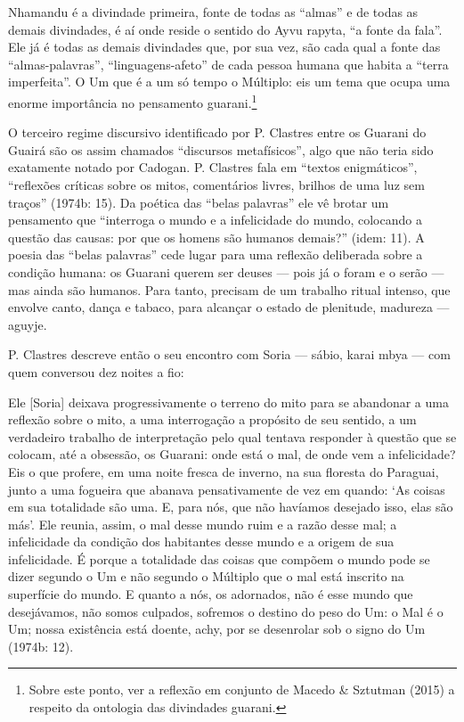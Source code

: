 Nhamandu é a divindade primeira, fonte de todas as ``almas'' e de todas as
demais divindades, é aí onde reside o sentido do Ayvu rapyta, ``a fonte
da fala''. Ele já é todas as demais divindades que, por sua vez, são
cada qual a fonte das ``almas-palavras'', ``linguagens-afeto'' de cada
pessoa humana que habita a ``terra imperfeita''. O Um que é a um só tempo
o Múltiplo: eis um tema que ocupa uma enorme importância no pensamento
guarani.\footnote{Sobre este ponto, ver a reflexão em conjunto de
Macedo \& Sztutman (2015) a respeito da ontologia das divindades
guarani.}

O terceiro regime discursivo identificado por P. Clastres entre os
Guarani do Guairá são os assim chamados ``discursos metafísicos'', algo
que não teria sido exatamente notado por Cadogan. P. Clastres fala em
``textos enigmáticos'', ``reflexões críticas sobre os mitos, comentários
livres, brilhos de uma luz sem traços'' (1974b: 15). Da poética das
``belas palavras'' ele vê brotar um pensamento que ``interroga o mundo e a
infelicidade do mundo, colocando a questão das causas: por que os
homens são humanos demais?'' (idem: 11). A poesia das ``belas palavras''
cede lugar para uma reflexão deliberada sobre a condição humana: os
Guarani querem ser deuses --- pois já o foram e o serão --- mas ainda são
humanos. Para tanto, precisam de um trabalho ritual intenso, que
envolve canto, dança e tabaco, para alcançar o estado de plenitude,
madureza --- aguyje. 

P. Clastres descreve então o seu encontro com Soria --- sábio,  karai mbya
---  com quem conversou dez noites a fio: 

Ele [Soria] deixava progressivamente o terreno do mito para se abandonar
a uma reflexão sobre o mito, a uma interrogação a propósito de seu
sentido, a um verdadeiro trabalho de interpretação pelo qual tentava
responder à questão que se colocam, até a obsessão, os Guarani: onde
está o mal, de onde vem a infelicidade? Eis o que profere, em uma noite
fresca de inverno, na sua floresta do Paraguai, junto a uma fogueira
que abanava pensativamente de vez em quando: ‘As coisas em sua
totalidade são uma. E, para nós, que não havíamos desejado isso, elas
são más’. Ele reunia, assim, o mal desse mundo ruim e a razão desse
mal; a infelicidade da condição dos habitantes desse mundo e a origem
de sua infelicidade. É porque a totalidade das coisas que compõem o
mundo pode se dizer segundo o Um e não segundo o Múltiplo que o mal
está inscrito na superfície do mundo. E quanto a nós, os adornados, não
é esse mundo que desejávamos, não somos culpados, sofremos o destino do
peso do Um: o Mal é o Um; nossa existência está doente, achy, por se
desenrolar sob o signo do Um (1974b: 12).

